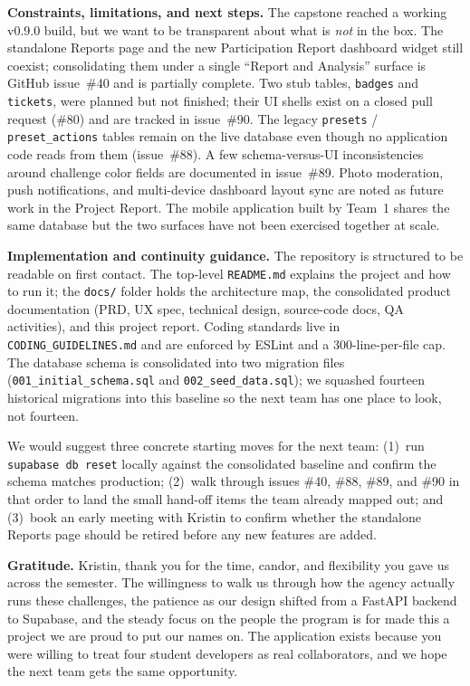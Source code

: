 \documentclass[11pt,letterpaper]{article}
\begin{document}
\textbf{Constraints, limitations, and next steps.} The capstone reached a
working v0.9.0 build, but we want to be transparent about what is \emph{not} in
the box. The standalone Reports page and the new Participation Report dashboard
widget still coexist; consolidating them under a single ``Report and Analysis''
surface is GitHub issue~\#40 and is partially complete. Two stub tables,
\texttt{badges} and \texttt{tickets}, were planned but not finished; their UI
shells exist on a closed pull request (\#80) and are tracked in issue~\#90. The
legacy \texttt{presets} / \texttt{preset\_actions} tables remain on the live
database even though no application code reads from them (issue~\#88). A few
schema-versus-UI inconsistencies around challenge color fields are documented
in issue~\#89. Photo moderation, push notifications, and multi-device dashboard
layout sync are noted as future work in the Project Report. The mobile
application built by Team~1 shares the same database but the two surfaces have
not been exercised together at scale.

\textbf{Implementation and continuity guidance.} The repository is structured
to be readable on first contact. The top-level \texttt{README.md} explains the
project and how to run it; the \texttt{docs/} folder holds the architecture
map, the consolidated product documentation (PRD, UX spec, technical design,
source-code docs, QA activities), and this project report. Coding standards
live in \texttt{CODING\_GUIDELINES.md} and are enforced by ESLint and a
300-line-per-file cap. The database schema is consolidated into two migration
files (\texttt{001\_initial\_schema.sql} and \texttt{002\_seed\_data.sql}); we
squashed fourteen historical migrations into this baseline so the next team
has one place to look, not fourteen.

We would suggest three concrete starting moves for the next team:
(1)~run \texttt{supabase db reset} locally against the consolidated baseline
and confirm the schema matches production;
(2)~walk through issues \#40, \#88, \#89, and \#90 in that order to land the
small hand-off items the team already mapped out; and
(3)~book an early meeting with Kristin to confirm whether the standalone
Reports page should be retired before any new features are added.

\textbf{Gratitude.} Kristin, thank you for the time, candor, and flexibility
you gave us across the semester. The willingness to walk us through how the
agency actually runs these challenges, the patience as our design shifted from
a FastAPI backend to Supabase, and the steady focus on the people the program
is for made this a project we are proud to put our names on. The application
exists because you were willing to treat four student developers as real
collaborators, and we hope the next team gets the same opportunity.
\end{document}
